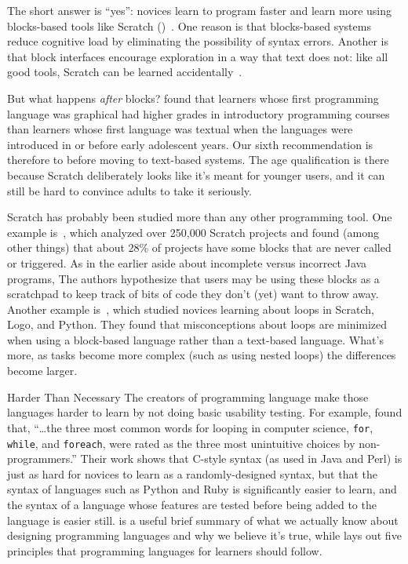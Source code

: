 
The short answer is ``yes'':
novices learn to program faster and learn more
using blocks-based tools like Scratch ()~\cite{Wein2017}.
One reason is that blocks-based systems reduce cognitive load by eliminating the possibility of syntax errors.
Another is that block interfaces encourage exploration in a way that text does not:
like all good tools,
Scratch can be learned accidentally~\cite{Malo2010}.

But what happens \emph{after} blocks?
\cite{Chen2018} found that learners whose first programming language was graphical
had higher grades in introductory programming courses
than learners whose first language was textual
when the languages were introduced in or before early adolescent years.
Our sixth recommendation is therefore to
before moving to text-based systems.
The age qualification is there because Scratch deliberately looks like it's meant for younger users,
and it can still be hard to convince adults to take it seriously.


Scratch has probably been studied more than any other programming tool.
One example is~\cite{Aiva2016},
which analyzed over 250,000 Scratch projects
and found (among other things) that about 28\% of projects have some blocks that are never called or triggered.
As in the earlier aside about incomplete versus incorrect Java programs,
The authors hypothesize that users may be using these blocks as a scratchpad
to keep track of bits of code they don't (yet) want to throw away.
Another example is~\cite{Grov2017,Mlad2017},
which studied novices learning about loops in Scratch, Logo, and Python.
They found that misconceptions about loops are minimized when using a block-based language
rather than a text-based language.
What's more,
as tasks become more complex (such as using nested loops)
the differences become larger.

\begin{aside}{Harder Than Necessary}
  The creators of programming language make those languages harder to learn by not doing basic usability testing.
  For example,
  \cite{Stef2013} found that,
  ``{\ldots}the three most common words for looping in computer science,
  \texttt{for}, \texttt{while}, and \texttt{foreach},
  were rated as the three most unintuitive choices by non-programmers.''
  Their work shows that C-style syntax (as used in Java and Perl)
  is just as hard for novices to learn as a randomly-designed syntax,
  but that the syntax of languages such as Python and Ruby
  is significantly easier to learn,
  and the syntax of a language whose features are tested before being added to the language is easier still.
  \cite{Stef2017} is a useful brief summary of what we actually know about designing programming languages
  and why we believe it's true,
  while \cite{Guzd2016} lays out five principles that programming languages for learners should follow.
\end{aside}

